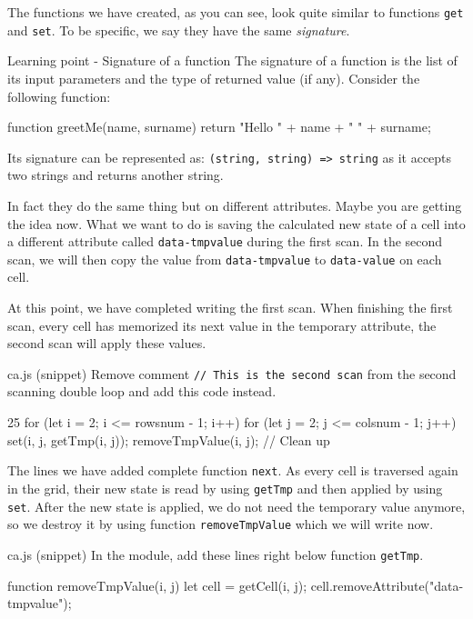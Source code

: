 The functions we have created, as you can see, look quite similar to functions
\texttt{get} and \texttt{set}. To be specific, we say they have the same
\textit{signature}.

\begin{tips}{Learning point - Signature of a function}
The signature of a function is the list of its input parameters and the type of returned
value (if any). Consider the following function:
\begin{code}
function greetMe(name, surname) {
  return "Hello " + name + " " + surname;
}
\end{code}
Its signature can be represented as: \texttt{(string, string) => string} as it accepts
two strings and returns another string.
\end{tips}

In fact they do the same thing but on different attributes. Maybe you are getting the
idea now. What we want to do is saving the calculated new state of a cell into a
different attribute called \texttt{data-tmpvalue} during the first scan. In the second scan,
we will then copy the value from \texttt{data-tmpvalue} to \texttt{data-value} on
each cell.

At this point, we have completed writing the first scan. When finishing the first scan,
every cell has memorized its next value in the temporary attribute,
the second scan will apply these values.

\begin{programcode}{ca.js (snippet)}
Remove comment \texttt{// This is the second scan} from the second scanning double loop and add this
code instead.
\begin{codeh1}{2}{5}
for (let i = 2; i <= rowsnum - 1; i++) {
  for (let j = 2; j <= colsnum - 1; j++) {
    set(i, j, getTmp(i, j));
    removeTmpValue(i, j); // Clean up
  }
}
\end{codeh1}
\end{programcode}

The lines we have added complete function \texttt{next}. As every cell is traversed again in the grid,
their new state is read by using \texttt{getTmp} and then applied by using \texttt{set}. After the new
state is applied, we do not need the temporary value anymore, so we destroy it by using function
\texttt{removeTmpValue} which we will write now.

\begin{programcode}{ca.js (snippet)}
In the module, add these lines right below function \texttt{getTmp}.
\begin{code}
function removeTmpValue(i, j) {
  let cell = getCell(i, j);
  cell.removeAttribute("data-tmpvalue");
}
\end{code}
\end{programcode}

